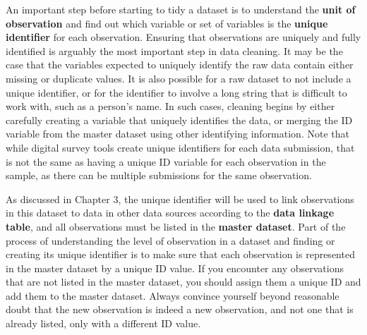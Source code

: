 An important step before starting to tidy a dataset is
to understand the \textbf{unit of observation}
and find out which variable or set of variables is the \textbf{unique identifier}
for each observation.
Ensuring that observations are uniquely and fully identified
is arguably the most important step in data cleaning.
It may be the case that the variables expected to uniquely identify
the raw data contain either missing or duplicate values.
It is also possible for a raw dataset to not include a unique identifier,
or for the identifier to involve a long string
that is difficult to work with, such as a person's name.
In such cases, cleaning begins by either carefully creating a variable
that uniquely identifies the data,
or merging the ID variable from the master dataset
using other identifying information.
Note that while digital survey tools create unique identifiers for each data submission,
that is not the same as having a unique ID variable for each observation in the sample,
as there can be multiple submissions for the same observation.

As discussed in Chapter 3,
the unique identifier will be used to link observations in this dataset
to data in other data sources according to the \textbf{data linkage table},
and all observations must be listed in the \textbf{master dataset}.
Part of the process of understanding the level of observation in a dataset
and finding or creating its unique identifier is to
make sure that each observation is represented in the master dataset by a unique ID value.
If you encounter any observations that are not listed in the master dataset,
you should assign them a unique ID and add them to the master dataset.
Always convince yourself beyond reasonable doubt that the new observation
is indeed a new observation,
and not one that is already listed, only with a different ID value.

